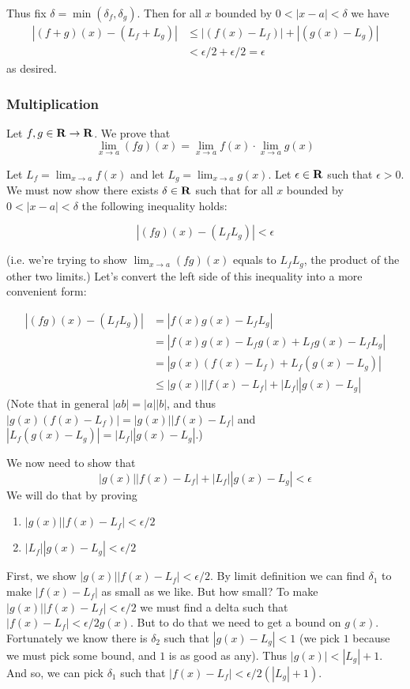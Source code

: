 Thus fix $\delta=\min(\delta_f, \delta_g)$. Then for all $x$ bounded by $0<|x-a|<\delta$ we have
\begin{align*}
    |(f+g)(x)-(L_f+L_g)|&\leq |(f(x)-L_f)|+|(g(x)-L_g)|\\
    &<\epsilon/2+\epsilon/2=\epsilon
\end{align*}
as desired.

\subsubsection{Multiplication}
Let $f,g\in\mathbf{R}\to\mathbf{R}$. We prove that
\[\lim_{x\to a}(fg)(x)=\lim_{x\to a}f(x)\cdot\lim_{x\to a}g(x)\]

Let $L_f=\lim_{x\to a}f(x)$ and let $L_g=\lim_{x\to a}g(x)$. Let $\epsilon\in\mathbf{R}$ such that $\epsilon>0$. We must now show there exists $\delta\in\mathbf{R}$ such that for all $x$ bounded by $0<|x-a|<\delta$ the following inequality holds:

\[|(fg)(x)-(L_fL_g)|<\epsilon\]

(i.e. we're trying to show $\lim_{x\to a}(fg)(x)$ equals to $L_fL_g$, the product of the other two limits.) Let's convert the left side of this inequality into a more convenient form:

\begin{align*}
    |(fg)(x)-(L_fL_g)|&=|f(x)g(x)-L_fL_g|\\
    &=|f(x)g(x)-L_fg(x)+L_fg(x)-L_fL_g|\\
    &=|g(x)(f(x)-L_f)+L_f(g(x)-L_g)|\\
    &\leq |g(x)||f(x)-L_f|+|L_f||g(x)-L_g|
\end{align*}
(Note that in general $|ab|=|a||b|$, and thus $|g(x)(f(x)-L_f)|=|g(x)||f(x)-L_f|$ and $|L_f(g(x)-L_g)|=|L_f||g(x)-L_g|$.) 

\vs

We now need to show that
\[|g(x)||f(x)-L_f|+|L_f||g(x)-L_g|<\epsilon\]
We will do that by proving
\begin{enumerate}
    \item $|g(x)||f(x)-L_f|<\epsilon/2$
    \item $|L_f||g(x)-L_g|<\epsilon/2$
\end{enumerate}

First, we show $|g(x)||f(x)-L_f|<\epsilon/2$. By limit definition we can find $\delta_1$ to make $|f(x)-L_f|$ as small as we like. But how small? To make $|g(x)||f(x)-L_f|<\epsilon/2$ we must find a delta such that $|f(x)-L_f|<\epsilon/2g(x)$. But to do that we need to get a bound on $g(x)$. Fortunately we know there is $\delta_2$ such that $|g(x)-L_g|<1$ (we pick $1$ because we must pick some bound, and $1$ is as good as any). Thus $|g(x)|<|L_g|+1$. And so, we can pick $\delta_1$ such that $|f(x)-L_f|<\epsilon/2(|L_g|+1)$.

